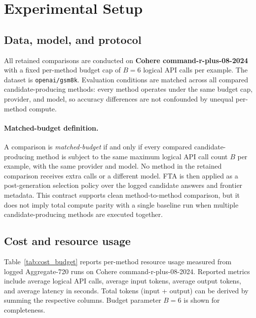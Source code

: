 \section{Experimental Setup}
\label{sec:experiments}

\subsection{Data, model, and protocol}
All retained comparisons are conducted on \textbf{Cohere command-r-plus-08-2024} with a fixed per-method budget cap of $B = 6$ logical API calls per example.  The dataset is \texttt{openai/gsm8k}.  Evaluation conditions are matched across all compared candidate-producing methods: every method operates under the same budget cap, provider, and model, so accuracy differences are not confounded by unequal per-method compute.

\paragraph{Matched-budget definition.} A comparison is \emph{matched-budget} if and only if every compared candidate-producing method is subject to the same maximum logical API call count $B$ per example, with the same provider and model.  No method in the retained comparison receives extra calls or a different model.  FTA is then applied as a post-generation selection policy over the logged candidate answers and frontier metadata.
This contract supports clean method-to-method comparison, but it does not imply total compute parity with a single baseline run when multiple candidate-producing methods are executed together.

\subsection{Cost and resource usage}
\label{sec:cost}

Table~\ref{tab:cost_budget} reports per-method resource usage measured from logged Aggregate-720 runs on Cohere command-r-plus-08-2024. Reported metrics include average logical API calls, average input tokens, average output tokens, and average latency in seconds.  Total tokens (input + output) can be derived by summing the respective columns.  Budget parameter $B = 6$ is shown for completeness.

